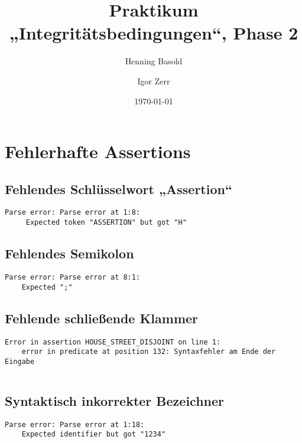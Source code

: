 \documentclass[a4paper]{article}
\title{Praktikum „Integritätsbedingungen“, Phase 2}
\author{Henning Basold \and Igor Zerr}
\date{\today}
\begin{document}
\maketitle

\section{Fehlerhafte Assertions}

\subsection{Fehlendes Schlüsselwort „Assertion“}


\begin{verbatim}
Parse error: Parse error at 1:8:
     Expected token "ASSERTION" but got "H"
\end{verbatim}

\subsection{Fehlendes Semikolon}


\begin{verbatim}
Parse error: Parse error at 8:1:
    Expected ";"
\end{verbatim}

\subsection{Fehlende schließende Klammer}


\begin{verbatim}
Error in assertion HOUSE_STREET_DISJOINT on line 1: 
    error in predicate at position 132: Syntaxfehler am Ende der Eingabe
\end{verbatim}

\begin{verbatim}
\end{verbatim}

\subsection{Syntaktisch inkorrekter Bezeichner}


\begin{verbatim}
Parse error: Parse error at 1:18:
    Expected identifier but got "1234"
\end{verbatim}
\end{document}
